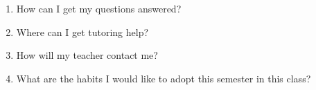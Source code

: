 \documentclass[12pt,fleqn]{article}
\begin{document}
\begin{enumerate}
\item How can I get my questions answered?\\

\vfill

\item Where can I get tutoring help?\\
\vfill
\item How will my teacher contact me? \\
\vfill

\item What are the habits I would like to adopt this semester in this class?
\vfill
\end{enumerate}
\end{document}
